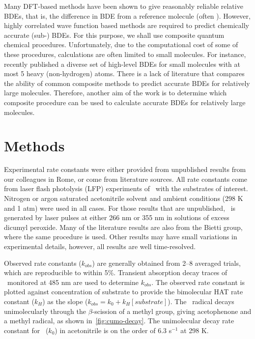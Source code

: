 Many DFT-based methods have been shown to give reasonably reliable relative BDEs, that is, the difference in BDE from a reference molecule (often ).\cite{DiLabio1999, Chan2012, Wiberg2014} However, highly correlated wave function based methods are required to predict chemically accurate (sub-\kcalmol) BDEs. For this purpose, we shall use composite quantum chemical procedures. Unfortunately, due to the computational cost of some of these procedures, calculations are often limited to small molecules. For instance, \citet{Chan2012} recently published a diverse set of high-level BDEs for small molecules with at most 5 heavy (non-hydrogen) atoms. There is a lack of literature that compares the ability of common composite methods to predict accurate  BDEs for relatively large molecules. Therefore, another aim of the work is to determine which composite procedure can be used to calculate accurate BDEs for relatively large molecules.

\section{Methods}\label{sec:hat-methods}

Experimental rate constants were either provided from unpublished results from our colleagues in Rome, or come from literature sources.\cite{Bietti2010, Bietti2011, Pischel2001, Salamone2011, Salamone2012, Salamone2012a, Salamone2013, Salamone2015} All rate constants come from laser flash photolysis (LFP) experiments of \cumo\ with the substrates of interest. Nitrogen or argon saturated acetonitrile solvent and ambient conditions (298 K and 1 atm) were used in all cases. For those results that are unpublished, \cumo\ is generated by laser pulses at either 266 nm or 355 nm in solutions of excess dicumyl peroxide. Many of the literature results are also from the Bietti group, where the same procedure is used. Other results may have small variations in experimental details, however, all results are well time-resolved.

Observed rate constants ($k_{obs}$) are generally obtained from 2--8 averaged trials, which are reproducible to within 5\%. Transient absorption decay traces of \cumo\ monitored at 485 nm are used to determine $k_{obs}$. The observed rate constant is plotted against concentration of substrate to provide the bimolecular HAT rate constant ($k_H$) as the slope ($k_{obs} = k_0 + k_H[substrate]$). The \cumo\ radical decays unimolecularly through the $\beta$-scission of a methyl group, giving acetophenone and a methyl radical, as shown in~\ref{fig:cumo-decay}. The unimolecular decay rate constant\cite{Avila1993, Avila1995} for \cumo\ ($k_0$) in acetonitrile is on the order of 6.3  s$^{-1}$ at 298 K.

